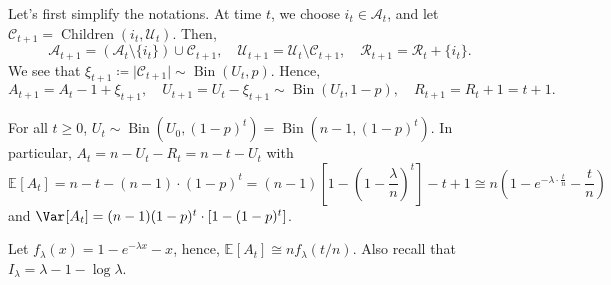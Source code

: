 Let's first simplify the notations. At time \(t\), we choose \(i_t \in \mathcal{A} _t\), and let \(\mathcal{C} _{t+1} = \operatorname{Children}(i_t, \mathcal{U} _t) \). Then,
\[
	\mathcal{A} _{t+1} = (\mathcal{A} _t \setminus \{ i_t \} ) \cup \mathcal{C} _{t+1}, \quad
	\mathcal{U} _{t+1} = \mathcal{U} _t \setminus \mathcal{C} _{t+1}, \quad
	\mathcal{R} _{t+1} = \mathcal{R} _{t} + \{ i_t \} .
\]
We see that \(\xi _{t+1} \coloneqq \lvert \mathcal{C} _{t+1} \rvert \sim \operatorname{Bin}(U_t, p) \). Hence,
\[
	A_{t+1} = A_t - 1 + \xi _{t+1}, \quad
	U_{t+1} = U_t - \xi _{t+1} \sim \operatorname{Bin}(U_t, 1 - p), \quad
	R_{t+1} = R_t + 1 = t+1.
\]

\begin{claim}
	For all \(t \geq 0\), \(U_t \sim \operatorname{Bin}(U_0, (1 - p)^t) = \operatorname{Bin}(n-1, (1 - p)^t)  \). In particular, \(A_t = n - U_t - R_t = n - t - U_t\) with
	\[
		\mathbb{E}_{}[A_t]
		= n - t - (n - 1) \cdot (1 - p)^t
		= (n-1) \left[ 1 - \left( 1- \frac{\lambda}{n} \right) ^t \right]  - t + 1
		\cong n \left( 1 - e^{-\lambda \cdot \frac{t}{n}} - \frac{t}{n} \right)
	\]
	and \(\Var_{}[A_t] = (n-1)(1 - p)^t \cdot [1 - (1 - p)^t]\).
\end{claim}

Let \(f_\lambda (x) = 1 - e^{-\lambda x} - x\), hence, \(\mathbb{E}_{}[A_t] \cong n f_\lambda (t / n)\). Also recall that \(I_\lambda = \lambda - 1 - \log \lambda\).






